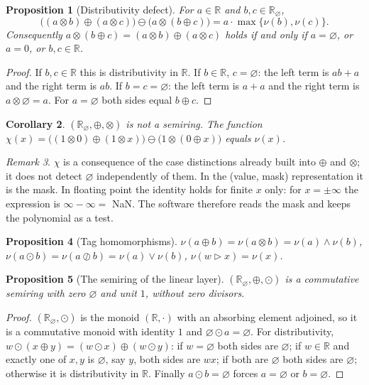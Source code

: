 \documentclass[11pt,a4paper]{article}
\newtheorem{proposition}{Proposition}
\newtheorem{corollary}[proposition]{Corollary}
\theoremstyle{definition}
\theoremstyle{remark}
\newtheorem{remark}[proposition]{Remark}
\newcommand{\R}{\mathbb{R}}
\newcommand{\Rn}{\R_{\varnothing}}
\newcommand{\nul}{\varnothing}
\newcommand{\op}{\oplus}
\newcommand{\ot}{\otimes}
\newcommand{\od}{\odot}
\newcommand{\sk}{\rhd}
\begin{document}
\begin{proposition}[Distributivity defect]\label{prop:defect}
For $a\in\R$ and $b,c\in\Rn$,
\[
\bigl((a\ot b)\op(a\ot c)\bigr)\ominus\bigl(a\ot(b\op c)\bigr)
 = a\cdot\max\{\nu(b),\nu(c)\}.
\]
Consequently $a\ot(b\op c)=(a\ot b)\op(a\ot c)$ holds if and only if
$a=\nul$, or $a=0$, or $b,c\in\R$.
\end{proposition}
\begin{proof}
If $b,c\in\R$ this is distributivity in $\R$. If $b\in\R$, $c=\nul$: the left
term is $ab+a$ and the right term is $ab$. If $b=c=\nul$: the left term is
$a+a$ and the right term is $a\ot\nul=a$. For $a=\nul$ both sides equal
$b\op c$.
\end{proof}

\begin{corollary}\label{cor:chi}
$(\Rn,\op,\ot)$ is not a semiring. The function
$\chi(x)=\bigl((1\ot 0)\op(1\ot x)\bigr)\ominus\bigl(1\ot(0\op x)\bigr)$
equals $\nu(x)$.
\end{corollary}

\begin{remark}\label{rem:chi}
$\chi$ is a consequence of the case distinctions already built into $\op$ and
$\ot$; it does not detect $\nul$ independently of them. In the (value, mask)
representation it is the mask. In floating point the identity holds for
finite $x$ only: for $x=\pm\infty$ the expression is $\infty-\infty=$ NaN.
The software therefore reads the mask and keeps the polynomial as a test.
\end{remark}

\begin{proposition}[Tag homomorphisms]\label{prop:tags}
$\nu(a\op b)=\nu(a\ot b)=\nu(a)\wedge\nu(b)$,\quad
$\nu(a\od b)=\nu(a\oslash b)=\nu(a)\vee\nu(b)$,\quad
$\nu(w\sk x)=\nu(x)$.
\end{proposition}

\begin{proposition}[The semiring of the linear layer]\label{prop:semiring}
$(\Rn,\op,\od)$ is a commutative semiring with zero $\nul$ and unit $1$, without
zero divisors.
\end{proposition}
\begin{proof}
$(\Rn,\od)$ is the monoid $(\R,\cdot)$ with an absorbing element adjoined, so it
is a commutative monoid with identity $1$ and $\nul\od a=\nul$. For
distributivity, $w\od(x\op y)=(w\od x)\op(w\od y)$: if $w=\nul$ both sides are
$\nul$; if $w\in\R$ and exactly one of $x,y$ is $\nul$, say $y$, both sides are
$wx$; if both are $\nul$ both sides are $\nul$; otherwise it is distributivity
in $\R$. Finally $a\od b=\nul$ forces $a=\nul$ or $b=\nul$.
\end{proof}
\end{document}
